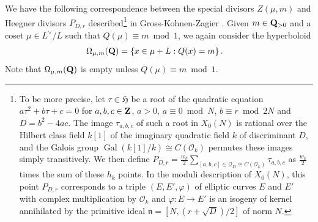 \documentclass{amsart}
\theoremstyle{definition}
\theoremstyle{definition}
\theoremstyle{definition}
\begin{document}
We have the following correspondence between the special divisors $Z(\mu, m)$ 
and Heegner divisors $P_{D, r}$ described\footnote{To be more precise, let $\tau \in \mathfrak{H}$ be a root of the quadratic equation $a \tau^2 + b \tau + c =0$
for $a, b, c \in {\bf{Z}}$, $a>0$, $a \equiv 0 \bmod N$, $b \equiv r \bmod 2N$ and $D = b^2 - 4ac$. The image $\tau_{a, b, c}$ of such a root 
in $X_0(N)$ is rational over the Hilbert class field $k[1]$ of the imaginary quadratic field $k$ of discriminant $D$, and the
Galois group $\operatorname{Gal}(k[1]/k) \cong C(\mathcal{O}_k)$ permutes these images simply transitively. We then define 
$P_{D, r} = \frac{w_k}{2} \sum_{[a, b, c] \in \mathcal{Q}_D \cong C(\mathcal{O}_k)} \tau_{a, b, c}$ as $\frac{w_k}{2}$ times the sum of these 
$h_k$ points. In the moduli description of $X_0(N)$, this point $P_{D,r}$ corresponds to a triple $(E, E', \varphi)$ of elliptic curves $E$ and $E'$
with complex multiplication by $\mathcal{O}_k$ and $\varphi: E \rightarrow E'$ is an isogeny of kernel annihilated by the primitive ideal 
$\mathfrak{n} = [N, (r + \sqrt{D}) /2] $ of norm $N$.} 
 in Gross-Kohnen-Zagier \cite{GKZ}.
Given $m \in {\bf{Q}}_{>0}$ and a coset $\mu \in L^{\vee}/L$ such that $Q(\mu) \equiv m \bmod 1$, we again consider the hyperboloid
\begin{align*} \Omega_{\mu, m}({\bf{Q}}) &= \left\lbrace x \in \mu + L : Q(x) = m \right\rbrace. \end{align*}
Note that $\Omega_{\mu, m}({\bf{Q}})$ is empty unless $Q(\mu) \equiv m \bmod 1$.
\end{document}
